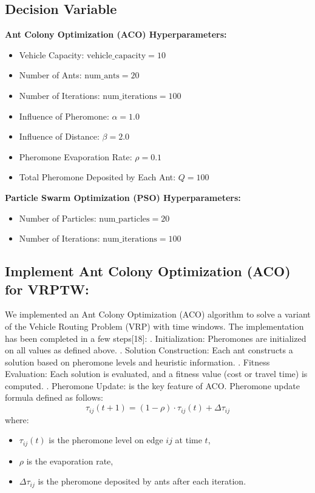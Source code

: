 \subsection{Decision Variable}
\textbf{Ant Colony Optimization (ACO) Hyperparameters:}
\begin{itemize}
    \item Vehicle Capacity: \( \text{vehicle\_capacity} = 10 \)
    \item Number of Ants: \( \text{num\_ants} = 20 \)
    \item Number of Iterations: \( \text{num\_iterations} = 100 \)
    \item Influence of Pheromone: \( \alpha = 1.0 \)
    \item Influence of Distance: \( \beta = 2.0 \)
    \item Pheromone Evaporation Rate: \( \rho = 0.1 \)
    \item Total Pheromone Deposited by Each Ant: \( Q = 100 \)
\end{itemize}
\textbf{Particle Swarm Optimization (PSO) Hyperparameters:}
\begin{itemize}
    \item Number of Particles: \( \text{num\_particles} = 20 \)
    \item Number of Iterations: \( \text{num\_iterations} = 100 \)
\end{itemize}
\subsection{Implement Ant Colony Optimization (ACO) for VRPTW:}
We implemented an Ant Colony Optimization (ACO) algorithm to solve a variant of the Vehicle Routing Problem (VRP) with time windows.
The implementation has been completed in a few steps[18]:
. Initialization: Pheromones are initialized on all values as defined above.
. Solution Construction: Each ant constructs a solution based on pheromone levels and heuristic information.
. Fitness Evaluation: Each solution is evaluated, and a fitness value (cost or travel time) is computed.
. Pheromone Update: is the key feature of ACO. Pheromone update formula defined as follows:
\newline
\begin{equation}
\tau_{ij}(t+1) = (1 - \rho) \cdot \tau_{ij}(t) + \Delta \tau_{ij}
\end{equation}
where:
\begin{itemize}
    \item \(\tau_{ij}(t)\) is the pheromone level on edge \(ij\) at time \(t\),
    \item \(\rho\) is the evaporation rate,
    \item \(\Delta \tau_{ij}\) is the pheromone deposited by ants after each iteration.
\end{itemize}

